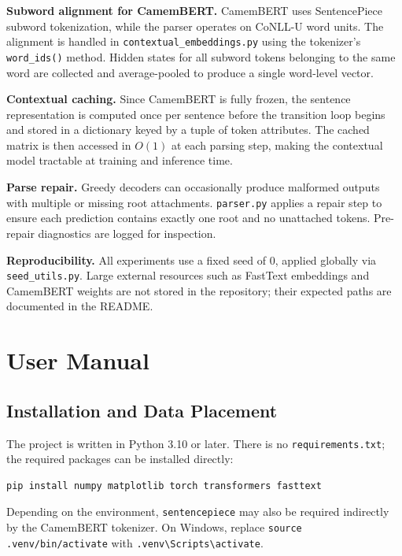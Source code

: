 \documentclass[12pt,letterpaper]{article}
\begin{document}
\textbf{Subword alignment for CamemBERT.} CamemBERT uses SentencePiece subword tokenization, while the parser operates on CoNLL-U word units. The alignment is handled in \texttt{contextual\_embeddings.py} using the tokenizer's \texttt{word\_ids()} method. Hidden states for all subword tokens belonging to the same word are collected and average-pooled to produce a single word-level vector.

\textbf{Contextual caching.} Since CamemBERT is fully frozen, the sentence representation is computed once per sentence before the transition loop begins and stored in a dictionary keyed by a tuple of token attributes. The cached matrix is then accessed in $O(1)$ at each parsing step, making the contextual model tractable at training and inference time.

\textbf{Parse repair.} Greedy decoders can occasionally produce malformed outputs with multiple or missing root attachments. \texttt{parser.py} applies a repair step to ensure each prediction contains exactly one root and no unattached tokens. Pre-repair diagnostics are logged for inspection.

\textbf{Reproducibility.} All experiments use a fixed seed of 0, applied globally via \texttt{seed\_utils.py}. Large external resources such as FastText embeddings and CamemBERT weights are not stored in the repository; their expected paths are documented in the README.\section{User Manual}
\label{sec:user_manual}

\subsection{Installation and Data Placement}
\label{subsec:installation}

The project is written in Python 3.10 or later. There is no \texttt{requirements.txt}; the required packages can be installed directly:

\begin{verbatim}
pip install numpy matplotlib torch transformers fasttext
\end{verbatim}

Depending on the environment, \texttt{sentencepiece} may also be required indirectly by the CamemBERT tokenizer. On Windows, replace \texttt{source .venv/bin/activate} with  \newline \texttt{.venv\textbackslash Scripts\textbackslash activate}.
\end{document}
